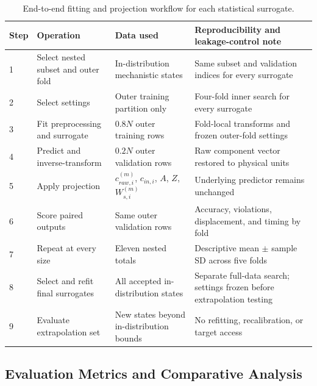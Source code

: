 \documentclass[a4paper,fleqn]{cas-sc}
\newcommand{\csvcomma}{,}
\begin{document}
\begin{table}[htbp]
\centering
\caption{End-to-end fitting and projection workflow for each statistical surrogate.}
\label{tab:modeling_workflow}
\scriptsize
\setlength{\tabcolsep}{3pt}
\begin{tabular}{p{0.7cm}p{3.3cm}p{3.0cm}p{4.2cm}}
\hline
Step & Operation & Data used & Reproducibility and leakage-control note \\
\hline
1 & Select nested subset and outer fold & In-distribution mechanistic states & Same subset and validation indices for every surrogate \\
2 & Select settings & Outer training partition only & Four-fold inner search for every surrogate \\
3 & Fit preprocessing and surrogate & $0.8N$ outer training rows & Fold-local transforms and frozen outer-fold settings \\
4 & Predict and inverse-transform & $0.2N$ outer validation rows & Raw component vector restored to physical units \\
5 & Apply projection & $c_{raw\csvcomma{}i}^{(m)}$\csvcomma{} $c_{in\csvcomma{}i}$\csvcomma{} $A$\csvcomma{} $Z$\csvcomma{} $W_{s\csvcomma{}i}^{(m)}$ & Underlying predictor remains unchanged \\
6 & Score paired outputs & Same outer validation rows & Accuracy\csvcomma{} violations\csvcomma{} displacement\csvcomma{} and timing by fold \\
7 & Repeat at every size & Eleven nested totals & Descriptive mean $\pm$ sample SD across five folds \\
8 & Select and refit final surrogates & All accepted in-distribution states & Separate full-data search; settings frozen before extrapolation testing \\
9 & Evaluate extrapolation set & New states beyond in-distribution bounds & No refitting\csvcomma{} recalibration\csvcomma{} or target access \\
\hline
\end{tabular}
\end{table}

\subsection{Evaluation Metrics and Comparative Analysis}
\end{document}
